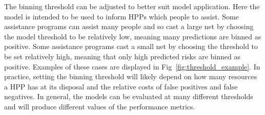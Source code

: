 \documentclass[10pt,letterpaper]{article}
\begin{document}
The binning threshold can be adjusted to better suit model application. Here the model is intended to be used to inform HPPs which people to assist. Some assistance programs can assist many people and so cast a large net by choosing the model threshold to be relatively low, meaning many predictions are binned as positive. Some assistance programs cast a small net by choosing the threshold to be set relatively high, meaning that only high predicted risks are binned as positive. Examples of these cases are displayed in Fig~\ref{fig:threshold_example}. In practice, setting the binning threshold will likely depend on how many resources a HPP has at its disposal and the relative costs of false positives and false negatives. In general, the models can be evaluated at many different thresholds and will produce different values of the performance metrics.
\end{document}
